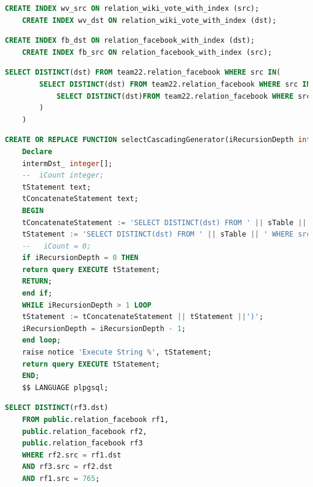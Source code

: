 \begin{lstlisting}[language=SQL,caption=Erstellen von Indexen auf relation Tabelle wikivote,frame=single, label={indexwikivote}]
    CREATE INDEX wv_src ON relation_wiki_vote_with_index (src);
    CREATE INDEX wv_dst ON relation_wiki_vote_with_index (dst);
\end{lstlisting}

\begin{lstlisting}[language=SQL,caption=Erstellen der Indexe für die relation Tabelle facebook,frame=single, label={indexfacebook}]
    CREATE INDEX fb_dst ON relation_facebook_with_index (dst);
    CREATE INDEX fb_src ON relation_facebook_with_index (src);
\end{lstlisting}

\begin{lstlisting}[language=SQL,caption = Verschachteltes SELECT Statement,frame=single,label={SELECT} ]
    SELECT DISTINCT(dst) FROM team22.relation_facebook WHERE src IN(
        SELECT DISTINCT(dst) FROM team22.relation_facebook WHERE src IN(
            SELECT DISTINCT(dst)FROM team22.relation_facebook WHERE src IN(1)
        )
    )
\end{lstlisting}

\begin{lstlisting}[language=SQL,caption = SELECT SourceCodeGenerator ,frame=single, label={SelectSourceCodeGenerator} ]
    CREATE OR REPLACE FUNCTION selectCascadingGenerator(iRecursionDepth integer, sTable text, startingNode integer ) RETURNS SETOF integer AS $$
    Declare
    intermDst_ integer[];
    --  iCount integer;
    tStatement text;
    tConcatenateStatement text;
    BEGIN
    tConcatenateStatement := 'SELECT DISTINCT(dst) FROM ' || sTable || ' WHERE src IN(';
    tStatement := 'SELECT DISTINCT(dst) FROM ' || sTable || ' WHERE src IN('||startingNode||')';
    --   iCount = 0;
    if iRecursionDepth = 0 THEN
    return query EXECUTE tStatement;
    RETURN;
    end if;
    WHILE iRecursionDepth > 1 LOOP
    tStatement := tConcatenateStatement || tStatement ||')';
    iRecursionDepth = iRecursionDepth - 1;
    end loop;
    raise notice 'Execute String %', tStatement;
    return query EXECUTE tStatement;
    END;
    $$ LANGUAGE plpgsql;
\end{lstlisting}

\begin{lstlisting}[language=SQL,caption = Rekursiver JOIN,frame=single, label={JOIN} ]
    SELECT DISTINCT(rf3.dst)
    FROM public.relation_facebook rf1,
    public.relation_facebook rf2,
    public.relation_facebook rf3
    WHERE rf2.src = rf1.dst
    AND rf3.src = rf2.dst
    AND rf1.src = 765;
\end{lstlisting}

